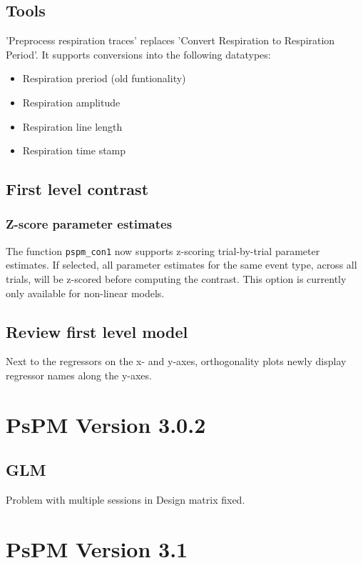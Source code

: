 \documentclass[english]{article}
\numberwithin{equation}{section}
\numberwithin{figure}{section}
\begin{document}
\subsection*{Tools}

'Preprocess respiration traces' replaces 'Convert Respiration to Respiration
Period'. It supports conversions into the following datatypes:
\begin{itemize}
\item Respiration preriod (old funtionality)
\item Respiration amplitude
\item Respiration line length
\item Respiration time stamp
\end{itemize}

\subsection*{First level contrast}

\subsubsection*{Z-score parameter estimates}

The function \texttt{pspm\_con1} now supports z-scoring trial-by-trial
parameter estimates. If selected, all parameter estimates for the
same event type, across all trials, will be z-scored before computing
the contrast. This option is currently only available for non-linear
models.

\subsection*{Review first level model}

Next to the regressors on the x- and y-axes, orthogonality plots newly
display regressor names along the y-axes. 

\section{PsPM Version 3.0.2}

\subsection*{GLM}

Problem with multiple sessions in Design matrix fixed.

\section{PsPM Version 3.1}
\end{document}
